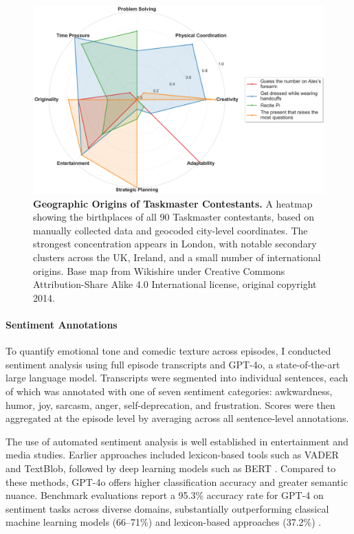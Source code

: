 \documentclass[10pt,letterpaper]{article}
\begin{document}
\begin{figure}[!h]
\centering
\includegraphics[width=\linewidth]{figures/main/Fig4.png}
\caption{{\bf Geographic Origins of Taskmaster Contestants.}
A heatmap showing the birthplaces of all 90 Taskmaster contestants, based on manually collected data and geocoded city-level coordinates. The strongest concentration appears in London, with notable secondary clusters across the UK, Ireland, and a small number of international origins. Base map from Wikishire under Creative Commons Attribution-Share Alike 4.0 International license, original copyright 2014.}
\label{fig:geo_origins}
\end{figure}
\FloatBarrier

\paragraph{Sentiment Annotations}
To quantify emotional tone and comedic texture across episodes, I conducted sentiment analysis using full episode transcripts and GPT-4o, a state-of-the-art large language model. Transcripts were segmented into individual sentences, each of which was annotated with one of seven sentiment categories: awkwardness, humor, joy, sarcasm, anger, self-deprecation, and frustration. Scores were then aggregated at the episode level by averaging across all sentence-level annotations.

The use of automated sentiment analysis is well established in entertainment and media studies. Earlier approaches included lexicon-based tools such as VADER and TextBlob, followed by deep learning models such as BERT \cite{Hutto2014,Devlin2018}. Compared to these methods, GPT-4o offers higher classification accuracy and greater semantic nuance. Benchmark evaluations report a 95.3\% accuracy rate for GPT-4 on sentiment tasks across diverse domains, substantially outperforming classical machine learning models (66–71\%) and lexicon-based approaches (37.2\%) \cite{Fu2024, Debess2024}.
\end{document}
